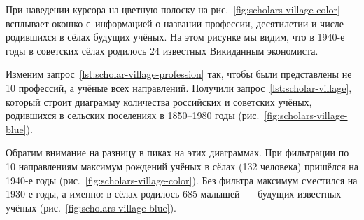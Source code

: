 При наведении курсора на цветную полоску на рис.~\ref{fig:scholars-village-color} 
всплывает окошко с~информацией о названии профессии, десятилетии и числе родившихся в сёлах будущих учёных. 
На этом рисунке мы видим, что в 1940-е годы в советских сёлах родилось 24 известных Викиданным экономиста.%

\begin{figure*}
    \setlength{\fboxsep}{0pt}%
    \setlength{\fboxrule}{1pt}%
	\label{fig:scholars-village-color}
    \caption[Диаграмма количества учёных по родам деятельности, родившихся в сёлах.]{Диаграмма количества учёных, родившихся в сельских поселениях, с разбивкой дат рождения по десятилетиям. Фильтрация по нескольким профессиям (научным направлениям). Диаграмма построена по запросу~\protect\ref{lst:scholar-village-profession}.}%
\end{figure*} 

Изменим запрос~\ref{lst:scholar-village-profession} так, 
чтобы были представлены не 10 профессий, а учёные всех направлений. 
Получили запрос~\ref{lst:scholar-village}, 
который строит диаграмму количества российских и советских учёных, 
родившихся в сельских поселениях в 1850--1980 годы (рис.~\ref{fig:scholars-village-blue}). 

Обратим внимание на разницу в пиках на этих диаграммах. 
При фильтрации по 10 направлениям максимум рождений учёных в сёлах (132 человека) 
пришёлся на 1940-е годы (рис.~\ref{fig:scholars-village-color}). 
Без фильтра максимум сместился на 1930-е годы, а именно: 
в сёлах родилось 685 малышей~--- будущих известных учёных (рис.~\ref{fig:scholars-village-blue}). 



